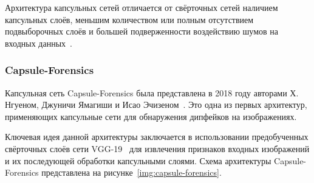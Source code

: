 Архитектура капсульных сетей отличается от свёрточных сетей наличием капсульных слоёв, меньшим количеством или полным отсутствием подвыборочных слоёв и большей подверженности воздействию шумов на входных данных~\cite{capsnn}. 

\subsubsection{Capsule-Forensics}

Капсульная сеть Capsule-Forensics была представлена в 2018 году авторами Х. Нгуеном, Джуничи Ямагиши и Исао Эчизеном~\cite{capsforensics}. Это одна из первых архитектур, применяющих капсульные сети для обнаружения дипфейков на изображениях.

Ключевая идея данной архитектуры заключается в использовании предобученных свёрточных слоёв сети VGG-19~\cite{vgg19} для извлечения признаков входных изображений и их последующей обработки капсульными слоями. Схема архитектуры Capsule-Forensics представлена на рисунке~\ref{img:capsule-forensics}.

